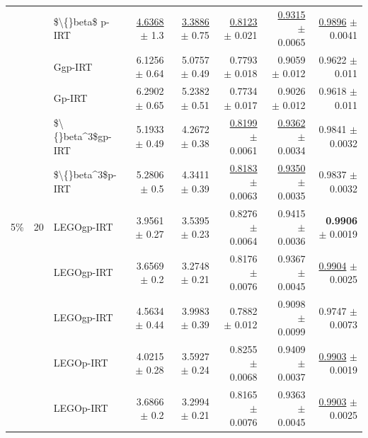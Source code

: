 \begin{longtable}{llp{}rrrrr}
 &  & \$\textbackslash\{\}beta\$ p-IRT & \underline{4.6368} {\scriptsize $\pm$ 1.3} & \underline{3.3886} {\scriptsize $\pm$ 0.75} & \underline{0.8123} {\scriptsize $\pm$ 0.021} & \underline{0.9315} {\scriptsize $\pm$ 0.0065} & \underline{0.9896} {\scriptsize $\pm$ 0.0041} \\
 &  & Ggp-IRT & 6.1256 {\scriptsize $\pm$ 0.64} & 5.0757 {\scriptsize $\pm$ 0.49} & 0.7793 {\scriptsize $\pm$ 0.018} & 0.9059 {\scriptsize $\pm$ 0.012} & 0.9622 {\scriptsize $\pm$ 0.011} \\
 &  & Gp-IRT & 6.2902 {\scriptsize $\pm$ 0.65} & 5.2382 {\scriptsize $\pm$ 0.51} & 0.7734 {\scriptsize $\pm$ 0.017} & 0.9026 {\scriptsize $\pm$ 0.012} & 0.9618 {\scriptsize $\pm$ 0.011} \\
 &  & \$\textbackslash\{\}beta\textasciicircum{}3\$gp-IRT & 5.1933 {\scriptsize $\pm$ 0.49} & 4.2672 {\scriptsize $\pm$ 0.38} & \underline{0.8199} {\scriptsize $\pm$ 0.0061} & \underline{0.9362} {\scriptsize $\pm$ 0.0034} & 0.9841 {\scriptsize $\pm$ 0.0032} \\
 &  & \$\textbackslash\{\}beta\textasciicircum{}3\$p-IRT & 5.2806 {\scriptsize $\pm$ 0.5} & 4.3411 {\scriptsize $\pm$ 0.39} & \underline{0.8183} {\scriptsize $\pm$ 0.0063} & \underline{0.9350} {\scriptsize $\pm$ 0.0035} & 0.9837 {\scriptsize $\pm$ 0.0032} \\
\midrule
5\% & 20 & LEGOgp-IRT & 3.9561 {\scriptsize $\pm$ 0.27} & 3.5395 {\scriptsize $\pm$ 0.23} & 0.8276 {\scriptsize $\pm$ 0.0064} & 0.9415 {\scriptsize $\pm$ 0.0036} & \textbf{0.9906} {\scriptsize $\pm$ 0.0019} \\
 &  & LEGOgp-IRT & 3.6569 {\scriptsize $\pm$ 0.2} & 3.2748 {\scriptsize $\pm$ 0.21} & 0.8176 {\scriptsize $\pm$ 0.0076} & 0.9367 {\scriptsize $\pm$ 0.0045} & \underline{0.9904} {\scriptsize $\pm$ 0.0025} \\
 &  & LEGOgp-IRT & 4.5634 {\scriptsize $\pm$ 0.44} & 3.9983 {\scriptsize $\pm$ 0.39} & 0.7882 {\scriptsize $\pm$ 0.012} & 0.9098 {\scriptsize $\pm$ 0.0099} & 0.9747 {\scriptsize $\pm$ 0.0073} \\
 &  & LEGOp-IRT & 4.0215 {\scriptsize $\pm$ 0.28} & 3.5927 {\scriptsize $\pm$ 0.24} & 0.8255 {\scriptsize $\pm$ 0.0068} & 0.9409 {\scriptsize $\pm$ 0.0037} & \underline{0.9903} {\scriptsize $\pm$ 0.0019} \\
 &  & LEGOp-IRT & 3.6866 {\scriptsize $\pm$ 0.2} & 3.2994 {\scriptsize $\pm$ 0.21} & 0.8165 {\scriptsize $\pm$ 0.0076} & 0.9363 {\scriptsize $\pm$ 0.0045} & \underline{0.9903} {\scriptsize $\pm$ 0.0025} \\

\end{longtable}
